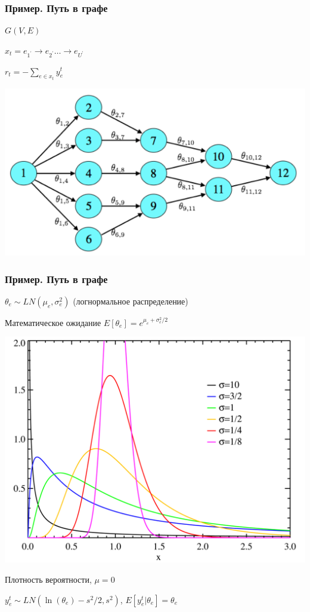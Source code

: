 \documentclass[fullscreen=true, bookmarks=true, hyperref={pdfencoding=unicode}]{beamer}
\begin{document}
\begin{frame}
  \frametitle{Пример. Путь в графе}

  $G(V, E)$

  $x_t = e_{1^\prime} \to e_{2^\prime} \dots \to e_{U^\prime}$

  $r_t = - \sum\limits_{e \in x_t} y_e^t$

  \begin{center}
    \includegraphics[keepaspectratio,
                     width=.7\paperwidth]{graph_path.png}
  \end{center}
\end{frame}


\begin{frame}
  \frametitle{Пример. Путь в графе}

  $ \theta_e \sim LN(\mu_e, \sigma_e^2)$ (логнормальное распределение)

  Математическое ожидание $E[\theta_e] = e^{\mu_e + \sigma_e^2/2}$


  \begin{center}
    \includegraphics[keepaspectratio,
                     width=.6\paperwidth]{Lognormal_distribution_PDF.png}

    Плотность вероятности, $\mu = 0$
  \end{center}

  $y_e^t \sim LN(\ln(\theta_e) - s^2/2, s^2)$,
  $E[y^t_e|\theta_e] = \theta_e$

\end{frame}
\end{document}
